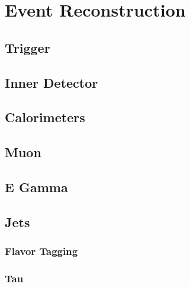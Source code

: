 \chapter{Event Reconstruction}

\section{Trigger}

\section{Inner Detector}

\section{Calorimeters}

\section{Muon}

\section{E Gamma}

\section{Jets}

	\subsection{Flavor Tagging}

	\subsection{Tau}

\section{\Etm}
	